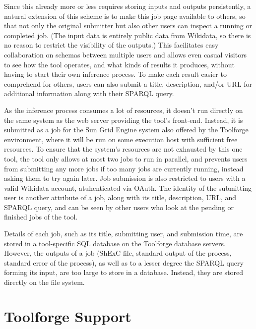Since this already more or less requires storing inputs and outputs persistently,
a natural extension of this scheme is to make this job page available to others,
so that not only the original submitter but also other users can inspect a running or completed job.
(The input data is entirely public data from Wikidata,
so there is no reason to restrict the visibility of the outputs.)
This facilitates easy collaboration on schemas between multiple users
and allows even casual visitors to see how the tool operates,
and what kinds of results it produces,
without having to start their own inference process.
To make each result easier to comprehend for others,
users can also submit a title, description, and/or URL for additional information
along with their SPARQL query. %

As the inference process consumes a lot of resources,
it doesn’t run directly on the same system as the web server providing the tool’s front-end.
Instead, it is submitted as a job for the Sun Grid Engine system also offered by the Toolforge environment,
where it will be run on some execution host with sufficient free resources.
To ensure that the system’s resources are not exhausted by this one tool,
the tool only allows at most two jobs to run in parallel,
and prevents users from submitting any more jobs if too many jobs are currently running,
instead asking them to try again later.
Job submission is also restricted to users with a valid Wikidata account,
atuhenticated via OAuth.
The identity of the submitting user is another attribute of a job,
along with its title, description, URL, and SPARQL query,
and can be seen by other users who look at the pending or finished jobs of the tool.

Details of each job,
such as its title, submitting user, and submission time,
are stored in a tool-specific SQL database on the Toolforge database servers.
However, the outputs of a job
(ShExC file, standard output of the process, standard error of the process),
as well as to a lesser degree the SPARQL query forming its input,
are too large to store in a database.
Instead, they are stored directly on the file system.

\section{Toolforge Support}
\label{sec:wdsi:Toolforge}

